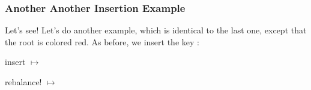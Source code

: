 \documentclass[aspectratio=169, handout]{beamer}
\begin{document}
\begin{frame}
  \frametitle{Another Another Insertion Example}

  Let's see! Let's do another example, which is identical to the last one, except
  that the root is colored red. As before, we insert the key :

  \pause
  \vspace{\fill}

  \begin{center}
    \begin{minipage}{0.25\textwidth}
      \begin{adjustbox}{center}
      \end{adjustbox}
    \end{minipage}
  \pause
    \begin{minipage}{0.10\textwidth}
      \begin{center}
        insert  $\mapsto$
      \end{center}
    \end{minipage}
    \begin{minipage}{0.25\textwidth}
        \begin{adjustbox}{center}
        \end{adjustbox}
    \end{minipage}
  \pause
    \begin{minipage}{0.10\textwidth}
      \begin{center}
        rebalance! $\mapsto$
      \end{center}
    \end{minipage}
    \begin{minipage}{0.25\textwidth}
        \begin{adjustbox}{center}
        \end{adjustbox}
    \end{minipage}
  \end{center}


\end{frame}
\end{document}
